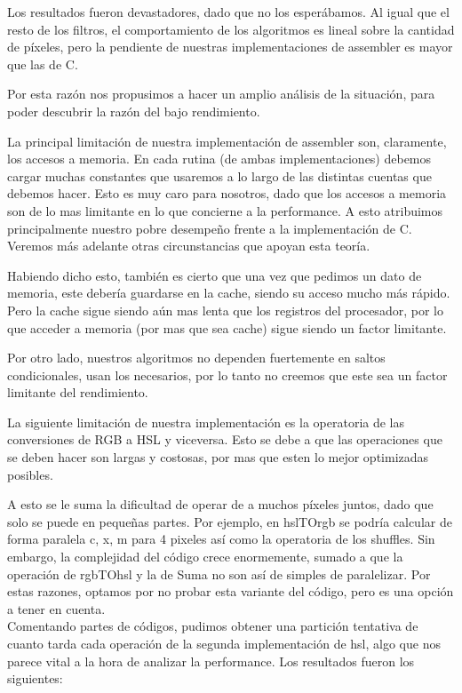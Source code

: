 Los resultados fueron devastadores, dado que no los esperábamos. Al igual que el resto de los filtros, el comportamiento de los algoritmos es lineal sobre la cantidad de píxeles, pero la pendiente de nuestras implementaciones de assembler es mayor que las de C.

Por esta razón nos propusimos a hacer un amplio análisis de la situación, para poder descubrir la razón del bajo rendimiento.

La principal limitación de nuestra implementación de assembler son, claramente, los accesos a memoria. En cada rutina (de ambas implementaciones) debemos cargar muchas constantes que usaremos a lo largo de las distintas cuentas que debemos hacer.
Esto es muy caro para nosotros, dado que los accesos a memoria son de lo mas limitante en lo que concierne a la performance. 
A esto atribuimos principalmente nuestro pobre desempeño frente a la implementación de C. Veremos más adelante otras circunstancias que apoyan esta teoría.

Habiendo dicho esto, también es cierto que una vez que pedimos un dato de memoria, este debería guardarse en la cache, siendo su acceso mucho más rápido. Pero la cache sigue siendo aún mas lenta que los registros del procesador, por lo que acceder a memoria (por mas que sea cache) sigue siendo un factor limitante.

Por otro lado, nuestros algoritmos no dependen fuertemente en saltos condicionales, usan los necesarios, por lo tanto no creemos que este sea un factor limitante del rendimiento.

La siguiente limitación de nuestra implementación es la operatoria de las conversiones de RGB a HSL y viceversa. Esto se debe a que las operaciones que se deben hacer son largas y costosas, por mas que esten lo mejor optimizadas posibles.

A esto se le suma la dificultad de operar de a muchos píxeles juntos, dado que solo se puede en pequeñas partes.
Por ejemplo, en hslTOrgb se podría calcular de forma paralela c, x, m para 4 pixeles así como la operatoria de los shuffles.
Sin embargo, la complejidad del código crece enormemente, sumado a que la operación de rgbTOhsl y la de Suma no son así de simples de paralelizar.
Por estas razones, optamos por no probar esta variante del código, pero es una opción a tener en cuenta.
\\

Comentando partes de códigos, pudimos obtener una partición tentativa de cuanto tarda cada operación de la segunda implementación de hsl, algo que nos parece vital a la hora de analizar la performance. Los resultados fueron los siguientes:


